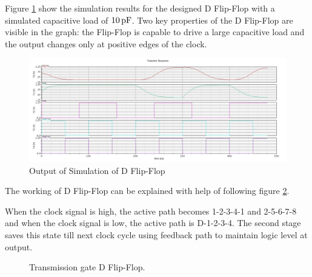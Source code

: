 \documentclass[parskip,oneside,colorbacktitle,10pt,accentcolor=tud1b]{tudreport}
\begin{document}
{Figure \ref{fig:dff_sim} show the simulation results for the designed D Flip-Flop with a simulated capacitive load of $\unit[10]{pF}$. Two key properties of the D Flip-Flop are visible in the graph: the Flip-Flop is capable to drive a large capacitive load and the output changes only at positive edges of the clock.

\begin{figure}[H]
	\begin{center}
		\includegraphics[scale=0.50]{DFlip-Flop_testbench_output}
        \caption{Output of Simulation of D Flip-Flop}
        \label{fig:dff_sim}	
	\end{center}
\end{figure}

The working of D Flip-Flop can be explained with help of following figure \ref{fig:dff_explanation}.

When the clock signal is high, the active path becomes 1-2-3-4-1 and 2-5-6-7-8 and when the clock signal is low, the active path is D-1-2-3-4. The second stage saves this state till next clock cycle using feedback path to maintain logic level at output.

\begin{figure}[H]
     \begin{center}
        \caption{Transmission gate D Flip-Flop.}
        \label{fig:dff_explanation}
    \end{center}
\end{figure}

}
\end{document}

